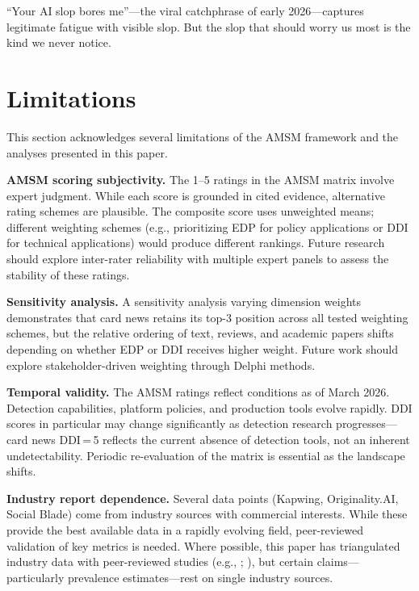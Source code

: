 \documentclass[12pt,a4paper]{article}
\begin{document}
``Your AI slop bores me''---the viral catchphrase of early 2026---captures legitimate fatigue with visible slop. But the slop that should worry us most is the kind we never notice.


\section{Limitations}
\label{sec:limitations}

This section acknowledges several limitations of the AMSM framework and the analyses presented in this paper.

\textbf{AMSM scoring subjectivity.} The 1--5 ratings in the AMSM matrix involve expert judgment. While each score is grounded in cited evidence, alternative rating schemes are plausible. The composite score uses unweighted means; different weighting schemes (e.g., prioritizing EDP for policy applications or DDI for technical applications) would produce different rankings. Future research should explore inter-rater reliability with multiple expert panels to assess the stability of these ratings.

\textbf{Sensitivity analysis.} A sensitivity analysis varying dimension weights demonstrates that card news retains its top-3 position across all tested weighting schemes, but the relative ordering of text, reviews, and academic papers shifts depending on whether EDP or DDI receives higher weight. Future work should explore stakeholder-driven weighting through Delphi methods.

\textbf{Temporal validity.} The AMSM ratings reflect conditions as of March 2026. Detection capabilities, platform policies, and production tools evolve rapidly. DDI scores in particular may change significantly as detection research progresses---card news DDI\,=\,5 reflects the current absence of detection tools, not an inherent undetectability. Periodic re-evaluation of the matrix is essential as the landscape shifts.

\textbf{Industry report dependence.} Several data points (Kapwing, Originality.AI, Social Blade) come from industry sources with commercial interests. While these provide the best available data in a rapidly evolving field, peer-reviewed validation of key metrics is needed. Where possible, this paper has triangulated industry data with peer-reviewed studies (e.g., \textcite{Jones2025}; \textcite{Moller2026}), but certain claims---particularly prevalence estimates---rest on single industry sources.
\end{document}
